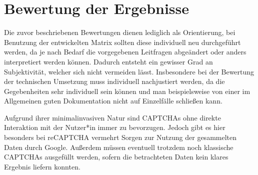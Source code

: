 \chapter{Bewertung der Ergebnisse}
\label{ch:bewertungergebnisse}

Die zuvor beschriebenen Bewertungen dienen lediglich als Orientierung, 
bei Benutzung der entwickelten Matrix sollten diese individuell neu durchgeführt werden,
da je nach Bedarf die vorgegebenen Leitfragen abgeändert oder anders interpretiert werden können.
Dadurch entsteht ein gewisser Grad an Subjektivität, welcher sich nicht vermeiden lässt.
Insbesondere bei der Bewertung der technischen Umsetzung muss individuell nachjustiert werden,
da die Gegebenheiten sehr individuell sein können und man beispielsweise von einer im Allgemeinen guten Dokumentation nicht auf Einzelfälle schließen kann.

Aufgrund ihrer minimalinvasiven Natur sind CAPTCHAs ohne direkte Interaktion mit der Nutzer*in immer zu bevorzugen.
Jedoch gibt es hier besonders bei reCAPTCHA vermehrt Sorgen zur Nutzung der gesammelten Daten durch Google. 
Außerdem müssen eventuell trotzdem noch klassische CAPTCHAs ausgefüllt werden, sofern die betrachteten Daten kein klares Ergebnis liefern konnten.